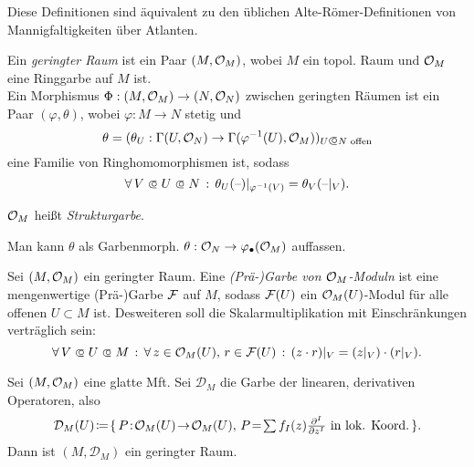\documentclass{cheat-sheet}
\begin{document}
\begin{bem}
  Diese Definitionen sind äquivalent zu den üblichen Alte-Römer-Definitionen von Mannigfaltigkeiten über Atlanten.
\end{bem}

\begin{defn}
  Ein \emph{geringter Raum} ist ein Paar $(M, \mathcal{O}_M)$, wobei $M$ ein topol. Raum und $\mathcal{O}_M$ eine Ringgarbe auf $M$ ist. \\
  Ein Morphismus $\Phi : (M, \mathcal{O}_M) \to (N, \mathcal{O}_N)$ zwischen geringten Räumen ist ein Paar $(\varphi, \theta)$, wobei $\varphi : M \to N$ stetig und
  \[ \theta = (\theta_U : \Gamma(U, \O_N) \to \Gamma(\varphi^{-1}(U), \O_M))_{U \opn N \text{ offen}} \]
  eine Familie von Ringhomomorphismen ist, sodass
  \[ \fa{V \opn U \opn N} \theta_U(\blank)|_{\varphi^{-1}(V)} = \theta_V(\blank|_V). \]
\end{defn}

\begin{sprech}
  $\mathcal{O}_M$ heißt \emph{Strukturgarbe}.
\end{sprech}


\begin{bem}
  Man kann $\theta$ als Garbenmorph. $\theta : \mathcal{O}_N \to \varphi_\bullet(\mathcal{O}_M)$ auffassen.
\end{bem}

\begin{defn}
  Sei $(M, \mathcal{O}_M)$ ein geringter Raum. Eine \emph{(Prä-)Garbe von $\mathcal{O}_M$-Moduln} ist eine mengenwertige (Prä-)Garbe $\mathcal{F}$ auf $M$, sodass $\mathcal{F}(U)$ ein $\mathcal{O}_M(U)$-Modul für alle offenen $U \subset M$ ist. Desweiteren soll die Skalarmultiplikation mit Einschränkungen verträglich sein:
  \[ \fa{V \opn U \opn M} \fa{z \in \O_M(U), \, r \in \Fais(U)} (z \cdot r)|_V = (z|_V) \cdot (r|_V). \]
\end{defn}

\begin{bsp}
  Sei $(M, \mathcal{O}_M)$ eine glatte Mft. Sei $\mathcal{D}_M$ die Garbe der linearen, derivativen Operatoren, also
  \[ \mathcal{D}_M(U) \!\coloneqq\! \{ \, P \!:\! \O_M(U) \!\to\! \O_M(U), \, P \!=\! \sum f_I(z) \tfrac{\partial^I}{\partial z^I} \text{ in lok. Koord.} \, \}. \]
  Dann ist $(M, \mathcal{D}_M)$ ein geringter Raum. %
\end{bsp}

\end{document}
